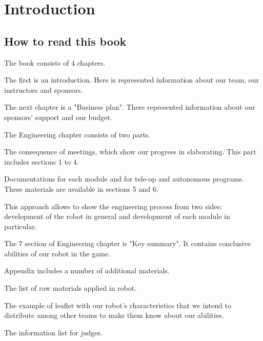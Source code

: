 \section{Introduction}

\subsection{How to read this book}

The book consists of 4 chapters. \newline
\begin{enumerate*}
    \item The first is an introduction. Here is represented information about our team, our instructors and sponsors. 
    
    
    \item The next chapter is a "Business plan". There represented information about our sponsors' support and our budget.\newline
    
    \item The Engineering chapter consists of two parts. 
    \begin{itemize*}
    	\item The consequence of meetings, which show our progress in elaborating. This part includes sections 1 to 4.
    	
    	\item Documentations for each module and for tele-op and autonomous programs. These materials are available in sections 5 and 6.
    	
    \end{itemize*}
    
    This approach allows to show the engineering process from two sides: development of the robot in general and development of each module in particular.
    
    The 7 section of Engineering chapter is "Key summary". It contains conclusive abilities of our robot in the game.
    
    \item Appendix includes a number of additional materials.
    \begin{itemize*}
    	\item The list of raw materials applied in robot.
    	
    	\item The example of leaflet with our robot's characteristics that we intend to distribute among other teams to make them know about our abilities.
    	
    	\item The information list for judges.
    	
    \end{itemize*}
    
\end{enumerate*}

	
\fillpage	